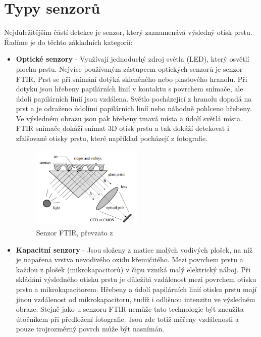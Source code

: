 \section{Typy senzorů}
Nejdůležitějším částí detekce je senzor, který zaznamenává výsledný otisk prstu. Řadíme je do těchto základních kategorií:
\begin{itemize}
\item \textbf{Optické senzory} - Využívají jednoduchý zdroj světla (LED), který osvětlí plochu prstu. \cite{Drahansky} Nejvíce používaným zástupcem optických senzorů je senzor FTIR. Prst se při snímání dotýká skleněného nebo plastového hranolu. Při dotyku jsou hřebeny papilárních linií v kontaktu s povrchem snímače, ale údolí papilárních linií jsou vzdálena. Světlo pocházející z hranolu dopadá na prst a je odraženo údolími papilárních liníí nebo náhodně pohlceno hřebeny. Ve výsledném obrazu jsou pak hřebeny tmavá místa a údolí světlá místa. FTIR snímače dokáží snímat 3D otisk prstu a tak dokáží detekovat i zfalšované otisky prstu, které například pocházejí z fotografie. \cite{Maltoni2009}

\begin{figure}[!htbp]
    \centering
    \includegraphics[width=200px]{obrazky-figures/ftiredit.png}
    \caption{Senzor FTIR, převzato z \cite{Maltoni2009}}
\end{figure}

\item \textbf{Kapacitní senzory} - Jsou složeny z matice malých vodivých plošek, na níž je napařena vrstva nevodivého oxidu křemičitého. \cite{Drahansky} Mezi povrchem prstu a každou z plošek (mikrokapacitorů) v čipu vzniká malý elektrický náboj. Při skládání výsledného otisku prstu je důležitá vzdálenost mezi povrchem otisku prstu a mikrokapacitorem. Hřebeny a údolí papilárních linií otisku prstu mají jinou vzdálenost od mikrokapacitoru, tudíž i odlišnou intenzitu ve výsledném obraze. Stejně jako u senzoru FTIR nemůže tato technologie být zneužita útočníkem při předložení fotografie. Jsou zde totiž měřeny vzdálenosti a pouze trojrozměrný povrch může být nasnímán. \cite{Maltoni2009}


\end{itemize}
